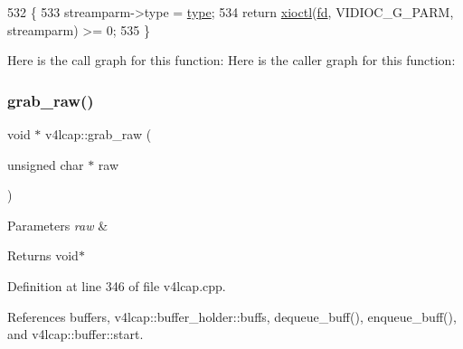 \begin{DoxyCode}
532                                                                                         \{
533     streamparm->type = \hyperlink{classstd_1_1conditional_1_1type}{type};
534     \textcolor{keywordflow}{return} \hyperlink{classv4lcap_ab5aaa5a8c0df17f5ca57e0b5170232cb}{xioctl}(\hyperlink{classv4lcap_a38109593bde997dad13b3a461569573d}{fd}, VIDIOC\_G\_PARM, streamparm) >= 0;
535 \}
\end{DoxyCode}
Here is the call graph for this function\+:
Here is the caller graph for this function\+:
\mbox{\label{classv4lcap_a2974ed334916901ebfd9a59aed2428e8}} 
\subsubsection{\texorpdfstring{grab\+\_\+raw()}{grab\_raw()}}
{\footnotesize\ttfamily void $\ast$ v4lcap\+::grab\+\_\+raw (\begin{DoxyParamCaption}\item[{unsigned char $\ast$}]{raw }\end{DoxyParamCaption})}


\begin{DoxyParams}{Parameters}
{\em raw} & \\
\hline
\end{DoxyParams}
\begin{DoxyReturn}{Returns}
void$\ast$ 
\end{DoxyReturn}


Definition at line 346 of file v4lcap.\+cpp.



References buffers, v4lcap\+::buffer\+\_\+holder\+::buffs, dequeue\+\_\+buff(), enqueue\+\_\+buff(), and v4lcap\+::buffer\+::start.


